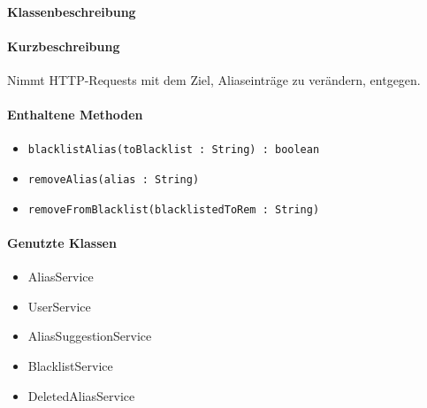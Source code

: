 \paragraph*{Klassenbeschreibung}%
\paragraph*{Kurzbeschreibung}
Nimmt HTTP-Requests mit dem Ziel, Aliaseinträge zu verändern, entgegen.
\paragraph*{Enthaltene Methoden}
\begin{itemize}
    \item \texttt{blacklistAlias(toBlacklist : String) : boolean}
    \item \texttt{removeAlias(alias : String)}
    \item \texttt{removeFromBlacklist(blacklistedToRem : String)}
\end{itemize}
\paragraph*{Genutzte Klassen}
\begin{itemize}
    \item AliasService
    \item UserService
    \item AliasSuggestionService
    \item BlacklistService
    \item DeletedAliasService
\end{itemize}
